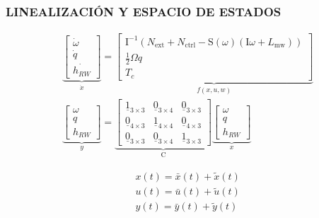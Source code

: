 \subsubsection{LINEALIZACIÓN Y ESPACIO DE ESTADOS}


\begin{equation}
	\begin{aligned}
		& \underbrace{\left[\begin{array}{c}
				\dot{\omega} \\
				\dot{q} \\
				\dot{h_{RW}}
			\end{array}\right]}_{\dot{x}}=\underbrace{\left[\begin{array}{c}
				{\mathrm{I}}^{-1}\left(N_{\mathrm{ext}}+N_{\mathrm{ctrl}}-{\mathrm{S}}(\omega)\left({\mathrm{I}} \omega+L_{\mathrm{mw}}\right)\right) \\
				\frac{1}{2} {\Omega} q \\
				T_c
			\end{array}\right]}_{f(x,u,w)}\\[10pt]
		& \underbrace{\left[\begin{array}{c}
				\omega \\
				q \\
				h_{RW}
			\end{array}\right]}_y=\underbrace{\left[\begin{array}{ccc}
				\underline{1}_{3 \times 3} & \underline{0}_{3 \times 4} & \underline{0}_{3 \times 3}\\
				\underline{0}_{4 \times 3} & \underline{1}_{4 \times 4} & \underline{0}_{4 \times 3} \\
				\underline{0}_{3 \times 3} & \underline{0}_{3 \times 4} & \underline{1}_{3 \times 3}
			\end{array}\right]}_{{\mathrm{C}}} \underbrace{\left[\begin{array}{c}
				\omega \\
				q \\
				h_{RW}
			\end{array}\right]}_x
	\end{aligned}	
\end{equation}



\begin{equation}
	\begin{aligned}
		& x(t) =\bar{x}(t)+ \tilde{x}(t) \\
		& u(t) =\bar{u}(t)+ \tilde{u}(t) \\
		& y(t) =\bar{y}(t)+ \tilde{y}(t) \\
	\end{aligned}
\end{equation}	

